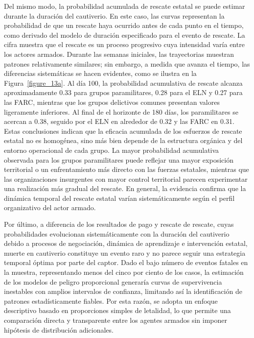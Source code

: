 \documentclass[12pt]{article}
\theoremstyle{definition}
\theoremstyle{remark}
\newcommand{\1}{\mathbf{1}}
\begin{document}
 Del mismo modo, la probabilidad acumulada de rescate estatal se puede estimar durante la duración del cautiverio. En este caso, las curvas representan la probabilidad de que un rescate haya ocurrido antes de cada punto en el tiempo, como derivado del modelo de duración especificado para el evento de rescate. La cifra muestra que el rescate es un proceso progresivo cuya intensidad varía entre los actores armados. Durante las semanas iniciales, las trayectorias muestran patrones relativamente similares; sin embargo, a medida que avanza el tiempo, las diferencias sistemáticas se hacen evidentes, como se ilustra en la Figura~\ref{figure_13a}. Al día 100, la probabilidad acumulativa de rescate alcanza aproximadamente 0.33 para grupos paramilitares, 0.28 para el ELN y 0.27 para las FARC, mientras que los grupos delictivos comunes presentan valores ligeramente inferiores. Al final de el horizonte de 180 días, los paramilitares se acercan a 0.38, seguido por el ELN en alrededor de 0.32 y las FARC en 0.31. Estas conclusiones indican que la eficacia acumulada de los esfuerzos de rescate estatal no es homogénea, sino más bien depende de la estructura orgánica y del entorno operacional de cada grupo. La mayor probabilidad acumulativa observada para los grupos paramilitares puede reflejar una mayor exposición territorial o un enfrentamiento más directo con las fuerzas estatales, mientras que las organizaciones insurgentes con mayor control territorial parecen experimentar una realización más gradual del rescate. En general, la evidencia confirma que la dinámica temporal del rescate estatal varían sistemáticamente según el perfil organizativo del actor armado.

Por último, a diferencia de los resultados de pago y rescate de rescate, cuyas probabilidades evolucionan sistemáticamente con la duración del cautiverio debido a procesos de negociación, dinámica de aprendizaje e intervención estatal, muerte en cautiverio constituye un evento raro y no parece seguir una estrategia temporal óptima por parte del captor. Dado el bajo número de eventos fatales en la muestra, representando menos del cinco por ciento de los casos, la estimación de los modelos de peligro proporcional generaría curvas de supervivencia inestables con amplios intervalos de confianza, limitando así la identificación de patrones estadísticamente fiables. Por esta razón, se adopta un enfoque descriptivo basado en proporciones simples de letalidad, lo que permite una comparación directa y transparente entre los agentes armados sin imponer hipótesis de distribución adicionales.  
\end{document}
